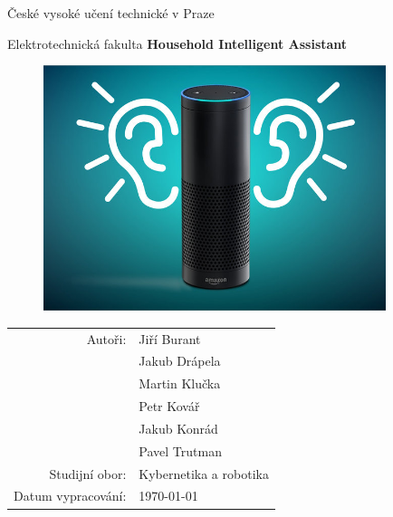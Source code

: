 \documentclass[12pt,a4paper]{article}
\author{Jakub Drápela}
\begin{document}
\pagestyle{empty}


	\begin{center}

\large

České vysoké učení technické v Praze

\medskip

Elektrotechnická fakulta
\vfill
\vfill
{\LARGE\bfseries Household Intelligent Assistant}


\vspace{9mm}

\begin{figure}[h!]
\begin{center}
\includegraphics[width = 10cm]{ucho.jpg} 
\end{center}
\end{figure}

\vspace{9mm}

\begin{tabular}{rl}

Autoři: & Jiří Burant \\
\noalign{\vspace{1mm}}
		& Jakub Drápela \\
		\noalign{\vspace{1mm}}
		& Martin Klučka\\
		\noalign{\vspace{1mm}}
		& Petr Kovář \\
		\noalign{\vspace{1mm}}
		& Jakub Konrád\\
		\noalign{\vspace{1mm}}
		& Pavel Trutman\\
\noalign{\vspace{2mm}}
Studijní obor: & Kybernetika a robotika \\
\noalign{\vspace{2mm}}
Datum vypracování: & \today\\
\end{tabular}

\end{center}
\end{document}
